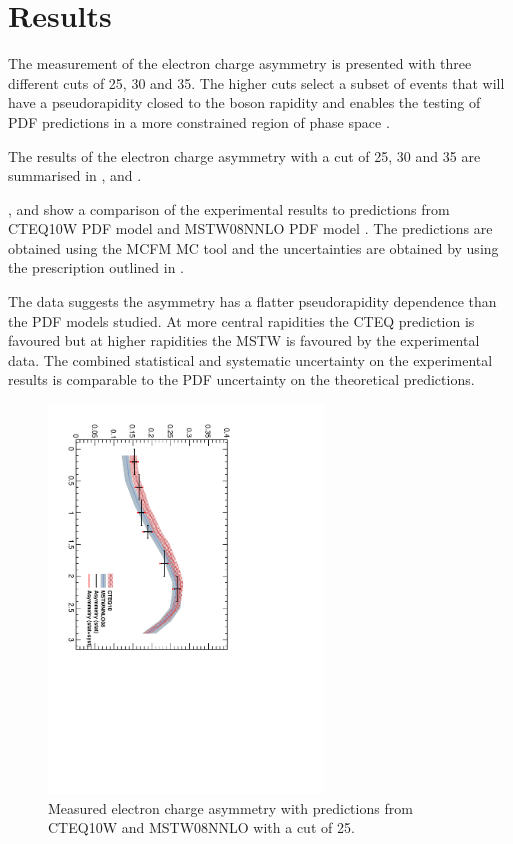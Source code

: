 \section{Results}
The measurement of the electron charge asymmetry is presented with three
different \pT cuts of 25, 30 and \unit{35}{\GeV}. 
The higher \Pt cuts select a subset of events that will have a pseudorapidity
closed to the \PW boson rapidity and enables  the testing of PDF predictions in
a more constrained region of phase space \cite{asym36}.

The results of the electron charge asymmetry with a \pT cut of \unit{25}{\GeV},
\unit{30}{\GeV} and \unit{35}{\GeV} are summarised in ,
  and .

,  and  show
a comparison of the experimental results to predictions from
CTEQ10W PDF model \cite{lai2010vv} and MSTW08NNLO PDF model
\cite{martin2009parton}. The predictions are obtained using the
MCFM\cite{campbellmcfm} MC tool and the uncertainties are obtained by using the
prescription outlined in .

The data suggests the asymmetry has a flatter pseudorapidity dependence than the
PDF models studied. At more central rapidities the CTEQ prediction is favoured
but at higher rapidities the MSTW is favoured by the experimental data.
The combined statistical and systematic uncertainty on the experimental results
is comparable to the PDF uncertainty on the theoretical predictions.

\begin{figure}[htbp]
  \begin{center}
  \includegraphics*[width=0.65\textwidth,angle=90]{Asym_25}
  \caption{\label{fig:asym25} Measured electron charge asymmetry with
predictions from CTEQ10W and MSTW08NNLO with a \pT cut of \unit{25}{\GeV}\cite{baisini2010electron}.}
  \end{center}
\end{figure}

